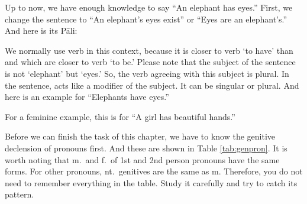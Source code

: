 Up to now, we have enough knowledge to say ``An elephant has eyes.'' First, we change the sentence to ``An elephant's eyes exist'' or ``Eyes are an elephant's.'' And here is its P\=ali:


We normally use verb  in this context, because it is closer to verb `to have' than  and  which are closer to verb `to be.' Please note that the subject of the sentence is not `elephant' but `eyes.' So, the verb agreeing with this subject is plural. In the sentence,  acts like a modifier of the subject. It can be singular or plural. And here is an example for ``Elephants have eyes.''


For a feminine example, this is for ``A girl has beautiful hands.''


Before we can finish the task of this chapter, we have to know the genitive declension of pronouns first. And these are shown in Table \ref{tab:genpron}. It is worth noting that m.\ and f.\ of 1st and 2nd person pronouns have the same forms. For other pronouns, nt.\ genitives are the same as m. Therefore, you do not need to remember everything in the table. Study it carefully and try to catch its pattern.

